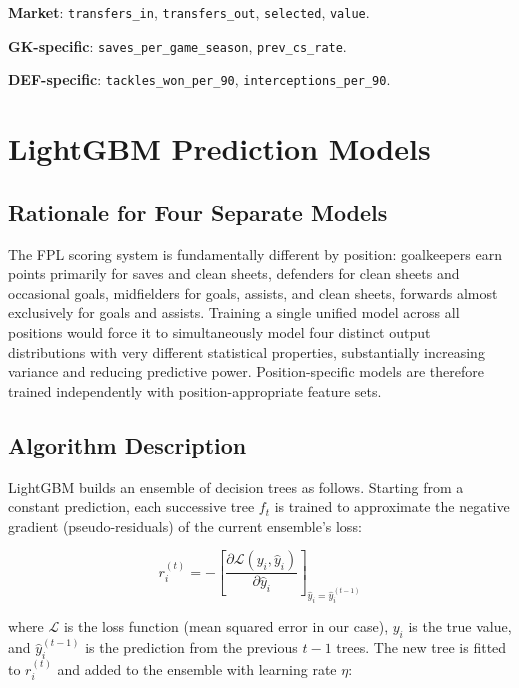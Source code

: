 \textbf{Market}: \texttt{transfers\_in}, \texttt{transfers\_out}, \texttt{selected}, \texttt{value}.

\textbf{GK-specific}: \texttt{saves\_per\_game\_season}, \texttt{prev\_cs\_rate}.

\textbf{DEF-specific}: \texttt{tackles\_won\_per\_90}, \texttt{interceptions\_per\_90}.

\section{LightGBM Prediction Models}

\subsection{Rationale for Four Separate Models}

The FPL scoring system is fundamentally different by position: goalkeepers earn points primarily for saves and clean sheets, defenders for clean sheets and occasional goals, midfielders for goals, assists, and clean sheets, forwards almost exclusively for goals and assists. Training a single unified model across all positions would force it to simultaneously model four distinct output distributions with very different statistical properties, substantially increasing variance and reducing predictive power. Position-specific models are therefore trained independently with position-appropriate feature sets.

\subsection{Algorithm Description}

LightGBM \cite{ke2017lightgbm} builds an ensemble of decision trees as follows. Starting from a constant prediction, each successive tree $f_t$ is trained to approximate the negative gradient (pseudo-residuals) of the current ensemble's loss:

\begin{equation}
r_i^{(t)} = -\left[\frac{\partial \mathcal{L}(y_i, \hat{y}_i)}{\partial \hat{y}_i}\right]_{\hat{y}_i = \hat{y}_i^{(t-1)}}
\end{equation}

where $\mathcal{L}$ is the loss function (mean squared error in our case), $y_i$ is the true value, and $\hat{y}_i^{(t-1)}$ is the prediction from the previous $t-1$ trees. The new tree is fitted to $r_i^{(t)}$ and added to the ensemble with learning rate $\eta$:

